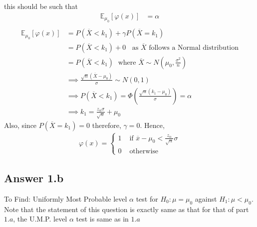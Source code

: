 \documentclass[a4paper]{article}
\begin{document}
this should be such that 
\begin{equation*}
	\begin{split}
		\mathbb{E}_{\mu_0}\left[ \varphi \left( x \right)  \right] &= \alpha\\
	\end{split}
\end{equation*}
\begin{equation*}
	\begin{split}
		\mathbb{E}_{\mu_0} \left[ \varphi\left( x \right)  \right] &= P\left( \overline{X}<k_1 \right) + \gamma P\left( \overline{X} = k_1 \right)\\
		&= P\left( \overline{X}<k_1 \right) + 0 \;\;\text{ as $\overline{X}$ follows a Normal distribution}\\
		&= P\left( \overline{X} < k_1 \right) \; \text{ where } \overline{X}  \sim N\left( \mu_0 , \frac{\sigma^2}{n} \right) \\
		&\implies \frac{\sqrt{n} \left( \overline{X} - \mu_0 \right)  }{\sigma} \sim N\left( 0,1 \right)\\
		&\implies P\left( \overline{X}< k_1 \right) = \Phi\left( \frac{ \sqrt{n}\left( k_1-\mu_0 \right)  }{\sigma} \right) = \alpha\\
		&\implies k_1 = \frac{z_\alpha \sigma}{\sqrt{n} } + \mu_0
	\end{split}
\end{equation*}
Also, since $P\left( \overline{X} = k_1	 \right) = 0$ therefore, $\gamma = 0$.
\newline\newline
Hence,
\begin{equation*}
	\begin{split}
		\varphi\left( x \right) = \begin{cases}
			1 & \text{ if } \overline{x} - \mu_0 < \frac{z_\alpha}{\sqrt{n} } \sigma\\
			0 & \text{ otherwise }
		\end{cases}
	\end{split}
\end{equation*}
\subsection{Answer 1.b}
To Find: Uniformly Most Probable level $\alpha$ test for $H_0 : \mu = \mu_0$ against $H_1 : \mu < \mu_0$.
\newline\newline
Note that the statement of this question is exactly same as that for that of part  $1.a$, the U.M.P. level  $\alpha$ test is same as in  $1.a$
\end{document}
